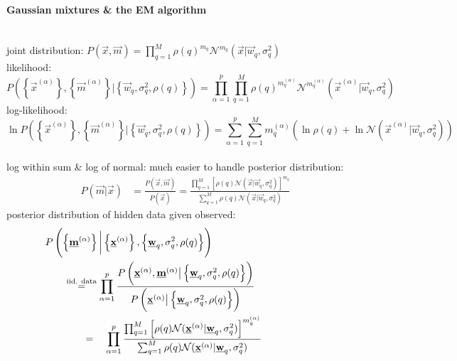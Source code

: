 \paragraph{Gaussian mixtures \& the EM algorithm}\mbox{}\\
joint distribution: $P(\vec{x}, \vec{m}) = \prod\limits_{q=1}^{M} \rho(q)^{m_q} \mathcal{N}^{m_q}(\vec{x} | \vec{w}_q, \sigma_q^2)$ \\
likelihood:
\begin{equation*}
P \left(\left\{ \vec{x}^{(\alpha)} \right\}, \left\{ \vec{m}^{(\alpha)} \right\} \bigg| \left\{ \vec{w}_q, \sigma_q^2, \rho(q) \right\} \right) = \prod_{\alpha=1}^{p} \prod_{q=1}^{M} \rho(q)^{m_q^{(\alpha)}} \mathcal{N}^{m_q^{(\alpha)}}(\vec{x}^{(\alpha)} | \vec{w}_q, \sigma_q^2)
\end{equation*}
log-likelihood:
\begin{equation*}
\ln P \left(\left\{ \vec{x}^{(\alpha)} \right\}, \left\{ \vec{m}^{(\alpha)} \right\} \bigg| \left\{ \vec{w}_q, \sigma_q^2, \rho(q) \right\} \right) = \sum_{\alpha=1}^{p} \sum_{q=1}^{M} m_q^{(\alpha)} \left( \ln \rho(q) + \ln  \mathcal{N}(\vec{x}^{(\alpha)} | \vec{w}_q, \sigma_q^2) \right)
\end{equation*}\\
\vspace{3mm}
log within sum \& log of normal: much easier to handle
posterior distribution: \\
\begin{align*}
P(\vec{m} | \vec{x}) &= \frac{P(\vec{x}, \vec{m})  }{P(\vec{x})} = \frac{\prod_{q=1}^{M} \left[ \rho(q) \mathcal{N}(\vec{x} | \vec{w}_q, \sigma_q^2) \right]^{m_q}}{\sum_{q=1}^{M}  \rho(q) \mathcal{N}(\vec{x} | \vec{w}_q, \sigma_q^2) }
\end{align*}
posterior distribution of hidden data given observed: \\
	\begin{align*}
	P \left( \left\{ \vec{m}^{(\alpha)} \right\} \bigg| \left\{ \vec{x}^{(\alpha)} \right\}, \left\{ \vec{w}_q, \sigma_q^2, \rho(q) \right\} \right) \hspace{4cm}
	\\  \stackrel{\text{iid. data}}{=} \prod_{\alpha=1}^{p} \frac{  P \left( \vec{x}^{(\alpha)} , \vec{m}^{(\alpha)} \big| \left\{ \vec{w}_q, \sigma_q^2, \rho(q) \right\} \right)  }{P \left( \vec{x}^{(\alpha)}  \big| \left\{ \vec{w}_q, \sigma_q^2, \rho(q) \right\} \right)} \hspace{2.5cm}
	\\ = \hspace{3.5mm} \prod_{\alpha=1}^{p} \frac{ \prod_{q=1}^{M} \left[ \rho(q) \mathcal{N}(\vec{x}^{(\alpha)} | \vec{w}_q, \sigma_q^2) \right]^{m_q^{(\alpha)}}  }{ \sum_{q=1}^{M}  \rho(q) \mathcal{N}(\vec{x}^{(\alpha)} | \vec{w}_q, \sigma_q^2)  } \hspace{2.25cm}
	\end{align*}


